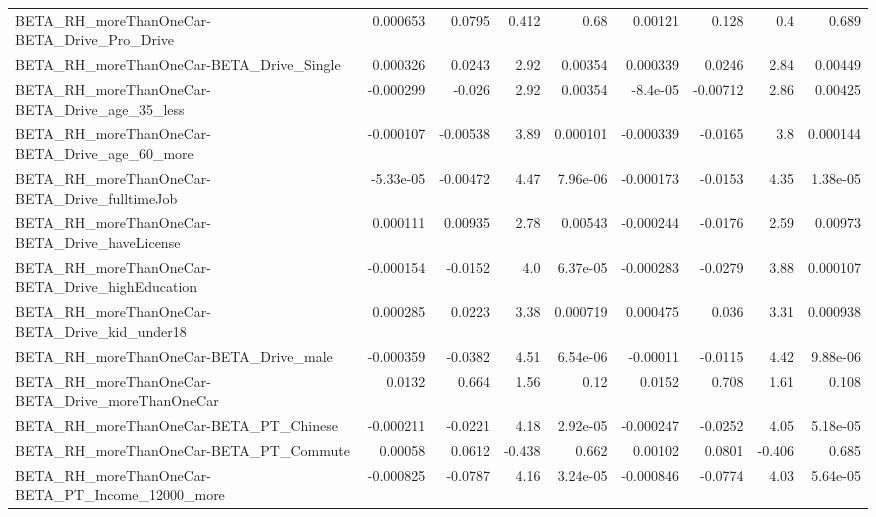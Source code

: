 \begin{tabular}{lrrrrrrrr}
BETA\_RH\_moreThanOneCar-BETA\_Drive\_Pro\_Drive        &    0.000653 &       0.0795 &     0.412 &     0.68 &    0.00121 &       0.128 &          0.4 &         0.689 \\
BETA\_RH\_moreThanOneCar-BETA\_Drive\_Single           &    0.000326 &       0.0243 &      2.92 &  0.00354 &   0.000339 &      0.0246 &         2.84 &       0.00449 \\
BETA\_RH\_moreThanOneCar-BETA\_Drive\_age\_35\_less      &   -0.000299 &       -0.026 &      2.92 &  0.00354 &   -8.4e-05 &    -0.00712 &         2.86 &       0.00425 \\
BETA\_RH\_moreThanOneCar-BETA\_Drive\_age\_60\_more      &   -0.000107 &     -0.00538 &      3.89 & 0.000101 &  -0.000339 &     -0.0165 &          3.8 &      0.000144 \\
BETA\_RH\_moreThanOneCar-BETA\_Drive\_fulltimeJob      &   -5.33e-05 &     -0.00472 &      4.47 & 7.96e-06 &  -0.000173 &     -0.0153 &         4.35 &      1.38e-05 \\
BETA\_RH\_moreThanOneCar-BETA\_Drive\_haveLicense      &    0.000111 &      0.00935 &      2.78 &  0.00543 &  -0.000244 &     -0.0176 &         2.59 &       0.00973 \\
BETA\_RH\_moreThanOneCar-BETA\_Drive\_highEducation    &   -0.000154 &      -0.0152 &       4.0 & 6.37e-05 &  -0.000283 &     -0.0279 &         3.88 &      0.000107 \\
BETA\_RH\_moreThanOneCar-BETA\_Drive\_kid\_under18      &    0.000285 &       0.0223 &      3.38 & 0.000719 &   0.000475 &       0.036 &         3.31 &      0.000938 \\
BETA\_RH\_moreThanOneCar-BETA\_Drive\_male             &   -0.000359 &      -0.0382 &      4.51 & 6.54e-06 &   -0.00011 &     -0.0115 &         4.42 &      9.88e-06 \\
BETA\_RH\_moreThanOneCar-BETA\_Drive\_moreThanOneCar   &      0.0132 &        0.664 &      1.56 &     0.12 &     0.0152 &       0.708 &         1.61 &         0.108 \\
BETA\_RH\_moreThanOneCar-BETA\_PT\_Chinese             &   -0.000211 &      -0.0221 &      4.18 & 2.92e-05 &  -0.000247 &     -0.0252 &         4.05 &      5.18e-05 \\
BETA\_RH\_moreThanOneCar-BETA\_PT\_Commute             &     0.00058 &       0.0612 &    -0.438 &    0.662 &    0.00102 &      0.0801 &       -0.406 &         0.685 \\
BETA\_RH\_moreThanOneCar-BETA\_PT\_Income\_12000\_more   &   -0.000825 &      -0.0787 &      4.16 & 3.24e-05 &  -0.000846 &     -0.0774 &         4.03 &      5.64e-05 \\

\end{tabular}
